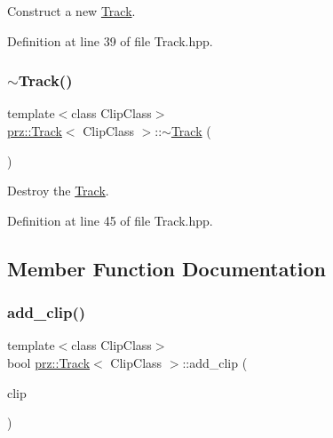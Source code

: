 Construct a new \mbox{\hyperlink{classprz_1_1_track}{Track}}. 



Definition at line 39 of file Track.\+hpp.

\mbox{\label{classprz_1_1_track_a84507a3e2e1cbb97d21298e73b7a24e3}} 
\subsubsection{\texorpdfstring{$\sim$Track()}{~Track()}}
{\footnotesize\ttfamily template$<$class Clip\+Class$>$ \\
\mbox{\hyperlink{classprz_1_1_track}{prz\+::\+Track}}$<$ Clip\+Class $>$\+::$\sim$\mbox{\hyperlink{classprz_1_1_track}{Track}} (\begin{DoxyParamCaption}{ }\end{DoxyParamCaption})\hspace{0.3cm}{\ttfamily [inline]}}



Destroy the \mbox{\hyperlink{classprz_1_1_track}{Track}}. 



Definition at line 45 of file Track.\+hpp.



\subsection{Member Function Documentation}
\mbox{\label{classprz_1_1_track_aa818d00358690b7dd76ae6e1eb788838}} 
\subsubsection{\texorpdfstring{add\_clip()}{add\_clip()}}
{\footnotesize\ttfamily template$<$class Clip\+Class$>$ \\
bool \mbox{\hyperlink{classprz_1_1_track}{prz\+::\+Track}}$<$ Clip\+Class $>$\+::add\+\_\+clip (\begin{DoxyParamCaption}\item[{Clip\+Class $\ast$}]{clip }\end{DoxyParamCaption})\hspace{0.3cm}{\ttfamily [inline]}}




